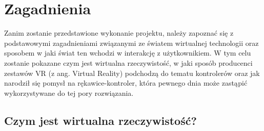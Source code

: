 \chapter{Zagadnienia}
\label{ch:zagadnienia}
Zanim zostanie przedstawione wykonanie projektu, należy zapoznać się z podstawowymi zagadnieniami związanymi ze światem wirtualnej technologii oraz sposobem w jaki świat ten wchodzi w interakcję z użytkownikiem. W tym celu zostanie pokazane czym jest wirtualna rzeczywistość, w jaki sposób producenci zestawów VR (z ang. Virtual Reality) podchodzą do tematu kontrolerów oraz jak narodził się pomysł na rękawice-kontroler, która pewnego dnia może zastąpić wykorzystywane do tej pory rozwiązania. 
	\section{Czym jest wirtualna rzeczywistość?}
	\label{sec:vr}
